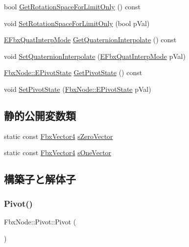 \begin{DoxyCompactItemize}
\item 
bool \hyperlink{class_fbx_node_1_1_pivot_a1dce9501d09b1953b4dc5c97a0517b9f}{Get\+Rotation\+Space\+For\+Limit\+Only} () const
\item 
void \hyperlink{class_fbx_node_1_1_pivot_a49a017748913e12ecd0079052ed2fda4}{Set\+Rotation\+Space\+For\+Limit\+Only} (bool p\+Val)
\item 
\hyperlink{fbxmath_8h_a9c7a0dfb52c83256d4a92c5c6d1be72a}{E\+Fbx\+Quat\+Interp\+Mode} \hyperlink{class_fbx_node_1_1_pivot_a2ff9c11d0b9b8c270eb9ba1f39dcc4b3}{Get\+Quaternion\+Interpolate} () const
\item 
void \hyperlink{class_fbx_node_1_1_pivot_a6256262e2d4d5e851d68262f0c5b71bd}{Set\+Quaternion\+Interpolate} (\hyperlink{fbxmath_8h_a9c7a0dfb52c83256d4a92c5c6d1be72a}{E\+Fbx\+Quat\+Interp\+Mode} p\+Val)
\item 
\hyperlink{class_fbx_node_a153fc75958227fc6728a2233b630b58a}{Fbx\+Node\+::\+E\+Pivot\+State} \hyperlink{class_fbx_node_1_1_pivot_a8ca16147fd0a4e3f96727cbb50abb144}{Get\+Pivot\+State} () const
\item 
void \hyperlink{class_fbx_node_1_1_pivot_ab16f55dcd7b0058afb65395b003b5da4}{Set\+Pivot\+State} (\hyperlink{class_fbx_node_a153fc75958227fc6728a2233b630b58a}{Fbx\+Node\+::\+E\+Pivot\+State} p\+Val)
\end{DoxyCompactItemize}
\subsection*{静的公開変数類}
\begin{DoxyCompactItemize}
\item 
static const \hyperlink{class_fbx_vector4}{Fbx\+Vector4} \hyperlink{class_fbx_node_1_1_pivot_a5bcef181b0b941f66222adb91896ff2c}{s\+Zero\+Vector}
\item 
static const \hyperlink{class_fbx_vector4}{Fbx\+Vector4} \hyperlink{class_fbx_node_1_1_pivot_a885264a556ea04dc8baf96a0ef2067b1}{s\+One\+Vector}
\end{DoxyCompactItemize}


\subsection{構築子と解体子}
\mbox{\label{class_fbx_node_1_1_pivot_a1c6a597612cd876db8a767826aa06f44}} 
\subsubsection{\texorpdfstring{Pivot()}{Pivot()}}
{\footnotesize\ttfamily Fbx\+Node\+::\+Pivot\+::\+Pivot (\begin{DoxyParamCaption}{ }\end{DoxyParamCaption})}

